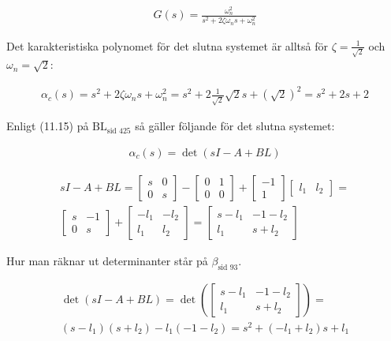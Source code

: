 \documentclass[a4paper]{article}
\newcommand{\mhb}[1]{$\beta_{\text{#1}}$}     %
\newcommand{\bl}[1]{$\text{BL}_{\text{#1}}$}  %
\begin{document}
\begin{align*}
  G(s) = \frac{\omega_n ^2}{s^2 + 2\zeta \omega_n s + \omega_n^2}
\end{align*}

Det karakteristiska polynomet för det slutna systemet är alltså för $\zeta = \frac{1}{\sqrt{2}}$ och $\omega_n = \sqrt{2}$:

\begin{align*}
  \alpha_c(s) = s^2 + 2\zeta \omega_n s + \omega_n^2 = s^2 + 2\frac{1}{\sqrt{2}} \sqrt{2} s + (\sqrt{2})^2 = s^2 + 2s + 2
\end{align*}

Enligt (11.15) på \bl{sid 425} så gäller följande för det slutna systemet:

\begin{align*}
  \alpha_c(s) = \det(sI - A + BL)
\end{align*}

\begin{align*}
  sI - A + BL = \begin{bmatrix}s & 0 \\ 0 & s\end{bmatrix} - \begin{bmatrix}0 & 1 \\ 0 & 0\end{bmatrix} + \begin{bmatrix}-1 \\ 1\end{bmatrix}\begin{bmatrix}l_1 & l_2\end{bmatrix} = \\
  \begin{bmatrix}s & -1 \\ 0 & s\end{bmatrix} + \begin{bmatrix}-l_1 & -l_2 \\ l_1 & l_2\end{bmatrix} = \begin{bmatrix}s - l_1 & -1 -l_2 \\ l_1 & s + l_2\end{bmatrix}
\end{align*}

Hur man räknar ut determinanter står på \mhb{sid 93}.

\begin{align*}
  \det(sI - A + BL) = \det \left( \begin{bmatrix}s - l_1 & -1 -l_2 \\ l_1 & s + l_2\end{bmatrix} \right) = \\
  (s - l_1)(s + l_2) - l_1(-1 -l_2) = s^2 + (-l_1 + l_2)s + l_1
\end{align*}
\end{document}
